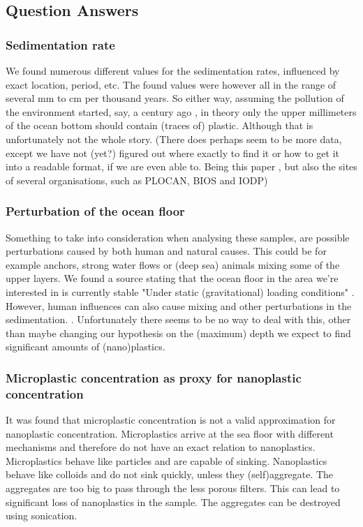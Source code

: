 \documentclass[twocolumn,a4paper,aps,amsmath,amssymb,floatfix,superscriptaddress]{revtex4-2}
\begin{document}
	\subsection{Question Answers}
	\subsubsection{Sedimentation rate}
	We found numerous different values for the sedimentation rates, influenced by exact location, period, etc. The found values were however all in the range of several mm \cite{Sediment distribution in the Atlantic} to cm \cite{Geomorphical investigaions NW Africa} per thousand years. So either way, assuming the pollution of the environment started, say, a century ago \cite{History of Plastic}, in theory only the upper millimeters of the ocean bottom should contain (traces of) plastic. Although that is unfortunately not the whole story.
	(There does perhaps seem to be more data, except we have not (yet?) figured out where exactly to find it or how to get it into a readable format, if we are even able to. Being this paper \cite{Atlantic sediment cores last 40k years}, but also the sites of several organisations, such as PLOCAN, BIOS and IODP)
	\subsubsection{Perturbation of the ocean floor}
	Something to take into consideration when analysing these samples, are possible perturbations caused by both human and natural causes. This could be for example anchors, strong water flows or (deep sea) animals mixing some of the upper layers. We found a source stating that the ocean floor in the area we're interested in is currently stable "Under static (gravitational) loading conditions" \cite{Sediment stability western Canary Islands}. However, human influences can also cause mixing and other perturbations in the sedimentation. \cite{Anthrophogenic influence sedimentation} \cite{Human impacts marine fossil record}. Unfortunately there seems to be no way to deal with this, other than maybe changing our hypothesis on the (maximum) depth we expect to find significant amounts of (nano)plastics.
	
	\subsubsection{Microplastic concentration as proxy for nanoplastic concentration}
	It was found that microplastic concentration is not a valid approximation for nanoplastic concentration. Microplastics arrive at the sea floor with different mechanisms and therefore do not have an exact relation to nanoplastics. \cite{Vertical flux of microplastic} \cite{MP in Atlantic deep waters} Microplastics behave like particles and are capable of sinking. Nanoplastics behave like colloids and do not sink quickly, unless they (self)aggregate. \cite{Aggregation of NP what we know} The aggregates are too big to pass through the less porous filters. This can lead to significant loss of nanoplastics in the sample. The aggregates can be destroyed using sonication. \cite{Heteroaggregation disaggregation} 
\end{document}
